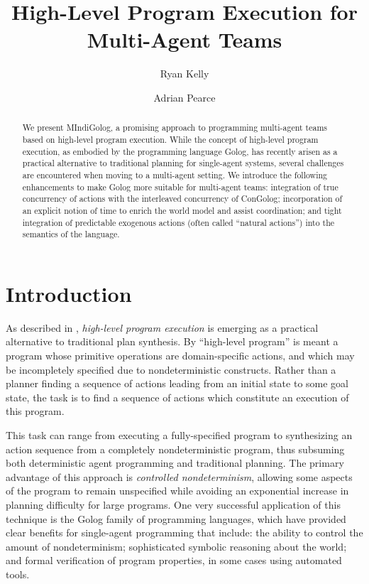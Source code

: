 \documentclass{llncs}
\title{High-Level Program Execution for Multi-Agent Teams}
\author{Ryan Kelly \and Adrian Pearce}
\institute{The University of Melbourne\\
\email{\{rfk,adrian\}@csse.unimelb.edu.au}}
\begin{document}
\maketitle

\begin{abstract}
We present MIndiGolog, a promising approach to programming multi-agent teams
based on high-level program execution. While the concept of high-level program
execution, as embodied by the programming language Golog, has recently arisen
as a practical
alternative to traditional planning for single-agent systems, several
challenges are encountered when moving to a multi-agent setting.  We introduce
the following enhancements to make Golog more suitable for multi-agent teams:
integration of true concurrency of actions with the interleaved concurrency
of ConGolog; incorporation of an explicit notion of time to enrich the world
model and assist coordination; and tight integration of predictable
exogenous actions (often called ``natural actions'') into the semantics of
the language.
\end{abstract}

\section{Introduction}

As described in \cite{giacomo99indigolog}, \emph{high-level program execution}
is emerging as a practical alternative to traditional plan
synthesis. By ``high-level program'' is meant a program whose
primitive operations are domain-specific actions, and which may be
incompletely specified due to nondeterministic constructs. Rather
than a planner finding a sequence of actions leading from an initial
state to some goal state, the task is to
find a sequence of actions which constitute an execution of this program.

This task can range from executing a fully-specified program to synthesizing
an action sequence from a completely nondeterministic program, thus
subsuming both deterministic agent programming and traditional planning.
The primary advantage of this approach is \emph{controlled nondeterminism},
allowing some aspects of the program to remain unspecified while avoiding
an exponential increase in planning difficulty for large programs.
One very successful application of this technique is the Golog \cite{levesque97golog}
family of programming languages, which have provided clear benefits
for single-agent programming that include: the ability to control
the amount of nondeterminism; sophisticated symbolic reasoning about
the world; and formal verification of program properties, in some
cases using automated tools.
\end{document}

